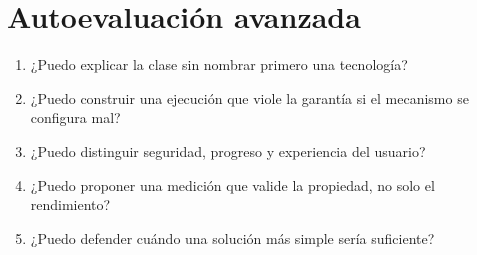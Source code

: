 \documentclass[variant=apuntes,cover=institutional,mode=screen]{ua-engineering-v6-article}
\begin{document}
\section{Autoevaluación avanzada}
\begin{enumerate}
\item ¿Puedo explicar la clase sin nombrar primero una tecnología?
\item ¿Puedo construir una ejecución que viole la garantía si el mecanismo se configura mal?
\item ¿Puedo distinguir seguridad, progreso y experiencia del usuario?
\item ¿Puedo proponer una medición que valide la propiedad, no solo el rendimiento?
\item ¿Puedo defender cuándo una solución más simple sería suficiente?
\end{enumerate}
\end{document}
